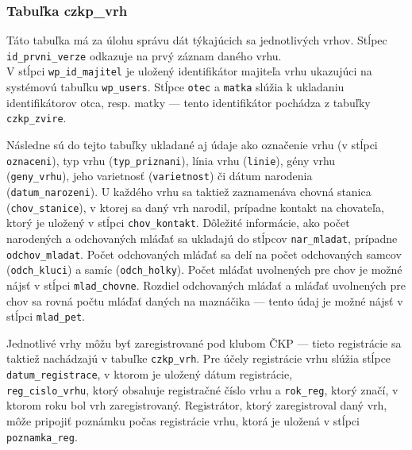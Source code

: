 \subsubsection*{Tabuľka czkp\_vrh}

Táto tabuľka má za úlohu správu dát týkajúcich sa jednotlivých vrhov. Stĺpec \texttt{id_prvni_verze} odkazuje na prvý záznam daného vrhu. \\ V stĺpci \texttt{wp_id_majitel} je uložený identifikátor majiteľa vrhu ukazujúci na systémovú tabuľku \texttt{wp_users}. Stĺpce \texttt{otec} a \texttt{matka} slúžia k ukladaniu identifikátorov otca, resp. matky --- tento identifikátor pochádza z tabuľky \texttt{czkp_zvire}.

Následne sú do tejto tabuľky ukladané aj údaje ako označenie vrhu (v stĺpci \texttt{oznaceni}), typ vrhu (\texttt{typ_priznani}), línia vrhu (\texttt{linie}), gény vrhu \\ (\texttt{geny_vrhu}), jeho varietnosť (\texttt{varietnost}) či dátum narodenia \\ (\texttt{datum_narozeni}). U každého vrhu sa taktiež zaznamenáva chovná stanica (\texttt{chov_stanice}), v ktorej sa daný vrh narodil, prípadne kontakt na chovateľa, ktorý je uložený v stĺpci \texttt{chov_kontakt}. Dôležité informácie, ako počet narodených a odchovaných mláďať sa ukladajú do stĺpcov \texttt{nar_mladat}, prípadne \texttt{odchov_mladat}. Počet odchovaných mláďať sa delí na počet odchovaných samcov (\texttt{odch_kluci}) a samíc (\texttt{odch_holky}). Počet mláďat uvolnených pre chov je možné nájsť v stĺpci \texttt{mlad_chovne}. Rozdiel odchovaných mláďať a mláďať uvolnených pre chov sa rovná počtu mláďať daných na maznáčika --- tento údaj je možné nájsť v stĺpci \texttt{mlad_pet}.

Jednotlivé vrhy môžu byť zaregistrované pod klubom ČKP --- tieto registrácie sa taktiež nachádzajú v tabuľke \texttt{czkp_vrh}. Pre účely registrácie vrhu slúžia stĺpce \texttt{datum_registrace}, v ktorom je uložený dátum registrácie, \\ \texttt{reg_cislo_vrhu}, ktorý obsahuje registračné číslo vrhu a \texttt{rok_reg}, ktorý značí, v ktorom roku bol vrh zaregistrovaný. Registrátor, ktorý zaregistroval daný vrh, môže pripojiť poznámku počas registrácie vrhu, ktorá je uložená v stĺpci \texttt{poznamka_reg}.

